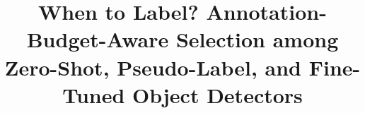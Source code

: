\documentclass[conference]{IEEEtran}
\begin{document}
\title{When to Label? Annotation-Budget-Aware Selection among Zero-Shot, Pseudo-Label, and Fine-Tuned Object Detectors}

\author{
\IEEEauthorblockA{\textit{[Affiliation]}\\
{[email]}}}

\maketitle
\end{document}
